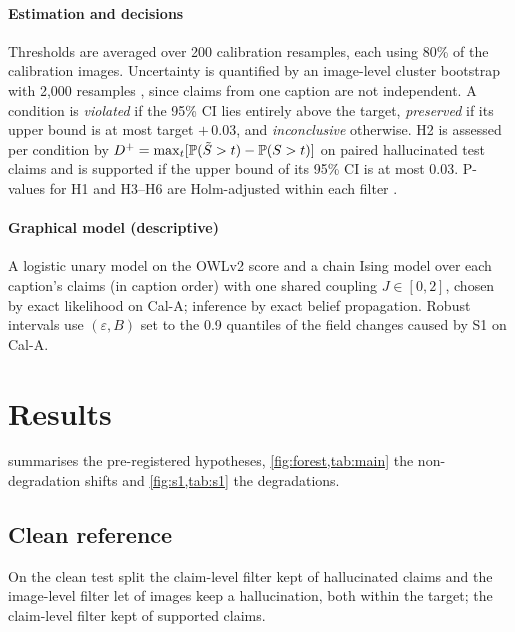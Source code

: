 \paragraph{Estimation and decisions} Thresholds are averaged over 200 calibration resamples, each using 80\% of the calibration images. Uncertainty is quantified by an image-level cluster bootstrap with 2{,}000 resamples \citep{efron1993introduction}, since claims from one caption are not independent. A condition is \emph{violated} if the 95\% CI lies entirely above the target, \emph{preserved} if its upper bound is at most target $+\,0.03$, and \emph{inconclusive} otherwise. H2 is assessed per condition by $D^+=\max_t[\mathbb{P}(\tilde S>t)-\mathbb{P}(S>t)]$ on paired hallucinated test claims and is supported if the upper bound of its 95\% CI is at most 0.03. P-values for H1 and H3--H6 are Holm-adjusted within each filter \citep{holm1979simple}.

\paragraph{Graphical model (descriptive)} A logistic unary model on the OWLv2 score and a chain Ising model over each caption's claims (in caption order) with one shared coupling $J\in[0,2]$, chosen by exact likelihood on Cal-A; inference by exact belief propagation. Robust intervals use $(\varepsilon,B)$ set to the 0.9 quantiles of the field changes caused by S1 on Cal-A.

\section{Results}\label{sec:results}

 summarises the pre-registered hypotheses, \cref{fig:forest,tab:main} the non-degradation shifts and \cref{fig:s1,tab:s1} the degradations.

\begin{widetable}[t]\centering\small
\caption{Pre-registered hypotheses (target 0.10). Holm-adjusted p-values in parentheses.}\label{tab:hyp}
\end{widetable}

\subsection{Clean reference}
On the clean test split the claim-level filter kept \CleanClaim{} of hallucinated claims and the image-level filter let \CleanImage{} of images keep a hallucination, both within the target; the claim-level filter kept \CleanKept{} of supported claims.

